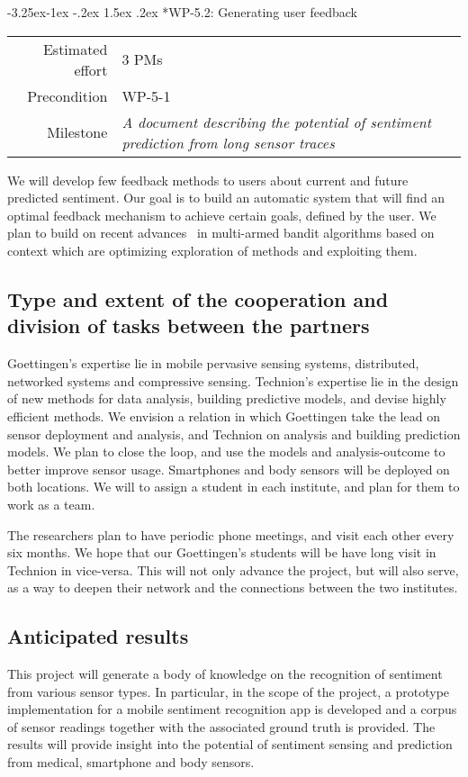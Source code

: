 \documentclass[12pt]{article}
\makeatletter
\renewcommand\paragraph{\@startsection{paragraph}{4}{\z@}%
  {-3.25ex\@plus -1ex \@minus -.2ex}%
  {1.5ex \@plus .2ex}%
  {\normalfont\normalsize\bfseries}}
\makeatother
\begin{document}
\paragraph*{WP-5.2: Generating user feedback}
\begin{tabular}{rl}
	Estimated effort& 3 PMs\\
	Precondition & WP-5-1\\
	Milestone & \begin{minipage}[t]{12.2cm}
		\textit{A document describing the potential of sentiment prediction from long sensor traces}\vspace{.2cm}
	\end{minipage}
\end{tabular}

\noindent
We will develop few feedback methods to users about current and future predicted sentiment. Our goal is to build an automatic system that will find an optimal feedback mechanism to achieve certain goals, defined by the user. We plan to build on recent advances~\cite{DBLP:journals/ml/CrammerG13} in multi-armed bandit algorithms based on context which are optimizing exploration of methods and exploiting them.


\subsection*{Type and extent of the cooperation and division of tasks between the partners}
Goettingen's expertise lie in mobile pervasive sensing systems, distributed, networked systems and compressive sensing.  
Technion's expertise lie in the design of new methods for data analysis, building predictive models, and devise highly efficient methods. We envision a relation in which Goettingen take the lead on sensor deployment and analysis, and Technion on analysis and building prediction models. We plan to close the loop, and use the models and analysis-outcome to better improve sensor usage. Smartphones and body sensors will be deployed on both locations. We will to assign a student in each institute, and plan for them to work as a team.

The researchers plan to have periodic phone meetings, and visit each other every six months. We hope that our Goettingen's students will be have long visit in Technion in vice-versa. This will not only advance the project, but will also serve, as a way to deepen their network and the connections between the two institutes. 


\subsection*{Anticipated results}
This project will generate a body of knowledge on the recognition of sentiment from various sensor types.
In particular, in the scope of the project, a prototype implementation for a mobile sentiment recognition app is developed and a corpus of sensor readings together with the associated ground truth is provided. 
The results will provide insight into the potential of sentiment sensing and prediction from medical, smartphone and body sensors.
\end{document}

